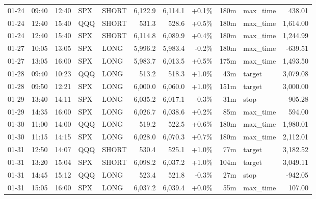 \documentclass[11pt,a4paper,twoside]{article}
\begin{document}
\begin{center}
\begin{longtable}{>{\color{txtmain}}l l l l l r r r r >{\color{txtmain}}l r}
01-24 & 09:40 & 12:40 & SPX & SHORT & 6,122.9 & 6,114.1 & \textcolor{wingreen}{+0.1\%} & 180m & max\_time & \textcolor{wingreen}{438.01} \\
01-24 & 12:40 & 15:40 & QQQ & SHORT & 531.3 & 528.6 & \textcolor{wingreen}{+0.5\%} & 180m & max\_time & \textcolor{wingreen}{1,614.00} \\
01-24 & 12:40 & 15:40 & SPX & SHORT & 6,114.8 & 6,089.9 & \textcolor{wingreen}{+0.4\%} & 180m & max\_time & \textcolor{wingreen}{1,244.99} \\
01-27 & 10:05 & 13:05 & SPX & LONG & 5,996.2 & 5,983.4 & \textcolor{lossred}{-0.2\%} & 180m & max\_time & \textcolor{lossred}{-639.51} \\
01-27 & 13:05 & 16:00 & SPX & LONG & 5,983.7 & 6,013.5 & \textcolor{wingreen}{+0.5\%} & 175m & max\_time & \textcolor{wingreen}{1,493.50} \\
01-28 & 09:40 & 10:23 & QQQ & LONG & 513.2 & 518.3 & \textcolor{wingreen}{+1.0\%} & 43m & target & \textcolor{wingreen}{3,079.08} \\
01-28 & 09:50 & 12:21 & SPX & LONG & 6,000.0 & 6,060.0 & \textcolor{wingreen}{+1.0\%} & 151m & target & \textcolor{wingreen}{3,000.00} \\
01-29 & 13:40 & 14:11 & SPX & LONG & 6,035.2 & 6,017.1 & \textcolor{lossred}{-0.3\%} & 31m & stop & \textcolor{lossred}{-905.28} \\
01-29 & 14:35 & 16:00 & SPX & LONG & 6,026.7 & 6,038.6 & \textcolor{wingreen}{+0.2\%} & 85m & max\_time & \textcolor{wingreen}{594.00} \\
01-30 & 11:00 & 14:00 & QQQ & LONG & 519.2 & 522.5 & \textcolor{wingreen}{+0.6\%} & 180m & max\_time & \textcolor{wingreen}{1,980.01} \\
01-30 & 11:15 & 14:15 & SPX & LONG & 6,028.0 & 6,070.3 & \textcolor{wingreen}{+0.7\%} & 180m & max\_time & \textcolor{wingreen}{2,112.01} \\
01-31 & 12:50 & 14:07 & QQQ & SHORT & 530.4 & 525.1 & \textcolor{wingreen}{+1.0\%} & 77m & target & \textcolor{wingreen}{3,182.52} \\
01-31 & 13:20 & 15:04 & SPX & SHORT & 6,098.2 & 6,037.2 & \textcolor{wingreen}{+1.0\%} & 104m & target & \textcolor{wingreen}{3,049.11} \\
01-31 & 14:45 & 15:12 & QQQ & LONG & 523.4 & 521.8 & \textcolor{lossred}{-0.3\%} & 27m & stop & \textcolor{lossred}{-942.05} \\
01-31 & 15:05 & 16:00 & SPX & LONG & 6,037.2 & 6,039.4 & \textcolor{wingreen}{+0.0\%} & 55m & max\_time & \textcolor{wingreen}{107.00} \\

\end{longtable}
\end{center}
\end{document}
